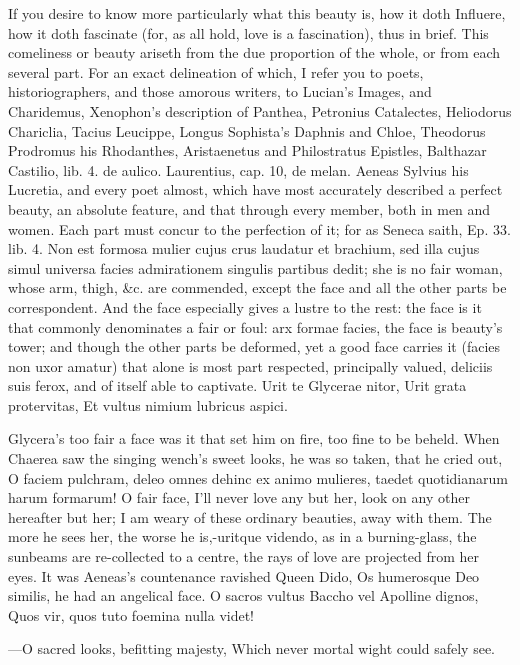 {If you desire to know more particularly what this beauty is, how it
doth Influere, how it doth fascinate (for, as all hold, love is a
fascination), thus in brief. This comeliness or beauty ariseth
from the due proportion of the whole, or from each several part. For an
exact delineation of which, I refer you to poets, historiographers, and
those amorous writers, to Lucian's Images, and Charidemus, Xenophon's
description of Panthea, Petronius Catalectes, Heliodorus Chariclia,
Tacius Leucippe, Longus Sophista's Daphnis and Chloe, Theodorus
Prodromus his Rhodanthes, Aristaenetus and Philostratus Epistles,
Balthazar Castilio, lib. 4. de aulico. Laurentius, cap. 10, de melan.
Aeneas Sylvius his Lucretia, and every poet almost, which have most
accurately described a perfect beauty, an absolute feature, and that
through every member, both in men and women. Each part must concur to
the perfection of it; for as Seneca saith, Ep. 33. lib. 4. Non est
formosa mulier cujus crus laudatur et brachium, sed illa cujus simul
universa facies admirationem singulis partibus dedit; she is no fair
woman, whose arm, thigh, \&c. are commended, except the face and all the
other parts be correspondent. And the face especially gives a lustre to
the rest: the face is it that commonly denominates a fair or foul: arx
formae facies, the face is beauty's tower; and though the other parts
be deformed, yet a good face carries it (facies non uxor amatur) that
alone is most part respected, principally valued, deliciis suis ferox,
and of itself able to captivate.
Urit te Glycerae nitor,
Urit grata protervitas,
Et vultus nimium lubricus aspici.

Glycera's too fair a face was it that set him on fire, too fine to be
beheld. When Chaerea saw the singing wench's sweet looks, he was
so taken, that he cried out, O faciem pulchram, deleo omnes dehinc ex
animo mulieres, taedet quotidianarum harum formarum! O fair face, I'll
never love any but her, look on any other hereafter but her; I am weary
of these ordinary beauties, away with them. The more he sees her, the
worse he is,-uritque videndo, as in a burning-glass, the sunbeams are
re-collected to a centre, the rays of love are projected from her eyes.
It was Aeneas's countenance ravished Queen Dido, Os humerosque Deo
similis, he had an angelical face.
O sacros vultus Baccho vel Apolline dignos,
Quos vir, quos tuto foemina nulla videt!

---O sacred looks, befitting majesty,
Which never mortal wight could safely see.

}
